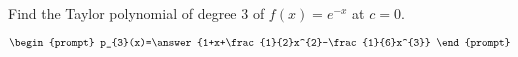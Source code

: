 \documentclass{ximera}
\author{Gregory Hartman \and Matthew Carr}
\begin{document}
\begin{exercise}




Find the Taylor polynomial of degree $3$ of $f(x)=e^{-x}$ at $c=0$.

\[
\begin{prompt}
p_{3}(x)=\answer{1+x+\frac{1}{2}x^{2}-\frac{1}{6}x^{3}}
\end{prompt}
\]

\end{exercise}
\end{document}
